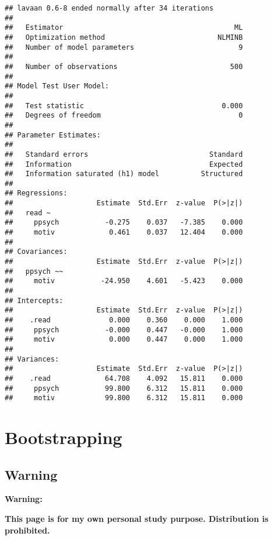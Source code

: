 \documentclass[]{book}
\begin{document}
\begin{verbatim}
## lavaan 0.6-8 ended normally after 34 iterations
## 
##   Estimator                                         ML
##   Optimization method                           NLMINB
##   Number of model parameters                         9
##                                                       
##   Number of observations                           500
##                                                       
## Model Test User Model:
##                                                       
##   Test statistic                                 0.000
##   Degrees of freedom                                 0
## 
## Parameter Estimates:
## 
##   Standard errors                             Standard
##   Information                                 Expected
##   Information saturated (h1) model          Structured
## 
## Regressions:
##                    Estimate  Std.Err  z-value  P(>|z|)
##   read ~                                              
##     ppsych           -0.275    0.037   -7.385    0.000
##     motiv             0.461    0.037   12.404    0.000
## 
## Covariances:
##                    Estimate  Std.Err  z-value  P(>|z|)
##   ppsych ~~                                           
##     motiv           -24.950    4.601   -5.423    0.000
## 
## Intercepts:
##                    Estimate  Std.Err  z-value  P(>|z|)
##    .read              0.000    0.360    0.000    1.000
##     ppsych           -0.000    0.447   -0.000    1.000
##     motiv             0.000    0.447    0.000    1.000
## 
## Variances:
##                    Estimate  Std.Err  z-value  P(>|z|)
##    .read             64.708    4.092   15.811    0.000
##     ppsych           99.800    6.312   15.811    0.000
##     motiv            99.800    6.312   15.811    0.000
\end{verbatim}

\hypertarget{bootstrapping}{%
\chapter{Bootstrapping}\label{bootstrapping}}

\hypertarget{warning}{%
\section{Warning}\label{warning}}

\textbf{Warning:}

\textbf{This page is for my own personal study purpose. Distribution is prohibited.}
\end{document}
